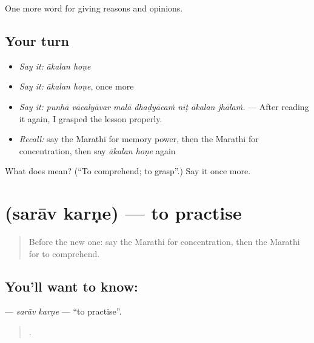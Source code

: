 \begin{grammarlens}[title={What you've built}]
One more word for giving reasons and opinions.
\end{grammarlens}

\subsection*{Your turn}
\begin{itemize}
\raggedright
  \item \emph{Say it:} \emph{ākalan hoṇe}
  \item \emph{Say it:} \emph{ākalan hoṇe}, once more
  \item \emph{Say it:} \emph{punhā vācalyāvar malā dhaḍyācaṁ nīṭ ākalan jhālaṁ.} — After reading it again, I grasped the lesson properly.
  \item \emph{Recall:} say the Marathi for memory power, then the Marathi for concentration, then say \emph{ākalan hoṇe} again
\end{itemize}

\begin{tcolorbox}[breakable,colback=teal!4,colframe=teal!35!black,title={Before you move on}]
What does   mean? (\textquotedblleft{}To comprehend; to grasp\textquotedblright{}.) Say it once more.
\end{tcolorbox}
\section[\texorpdfstring{\mr{सराव} \mr{करणे} (sarāv karṇe)}{सराव करणे (sarāv karṇe)}]{  (sarāv karṇe) — to practise}

\label{lesson:MR-C375-sarav-karne}



\begin{quote}
Before the new one: say the Marathi for concentration, then the Marathi for to comprehend.
\end{quote}

\subsection*{You'll want to know:  }
\textbf{ } — \emph{sarāv karṇe} — \textquotedblleft{}to practise\textquotedblright{}.

\begin{quote}
      .
\end{quote}


